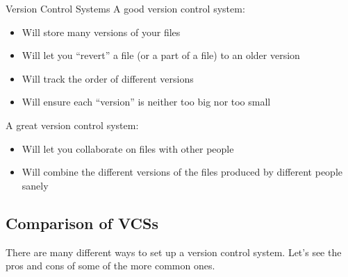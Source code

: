\begin{frame}{Version Control Systems}
  A good version control system:
  \begin{itemize}
    \item Will store many versions of your files \pause

    \item Will let you \enquote{revert} a file (or a part of a file) to an
      older version \pause

    \item Will track the order of different versions \pause

    \item Will ensure each \enquote{version} is neither too big nor too small
      \pause
  \end{itemize}
  A great version control system:
  \begin{itemize}
    \item Will let you collaborate on files with other people \pause

    \item Will combine the different versions of the files produced by
      different people sanely
  \end{itemize}
\end{frame}

\subsection{Comparison of VCSs}

There are many different ways to set up a version control system.  Let's see
the pros and cons of some of the more common ones.

